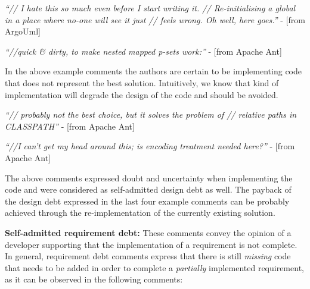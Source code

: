 {\vspace{1mm}
    \begin{displayquote}
        \textit{``// I hate this so much even before I start writing it. // Re-initialising a global in a place where no-one will see it just // feels wrong.  Oh well, here goes.''} - [from ArgoUml]
    \end{displayquote}
    \vspace{1mm}
    \begin{displayquote}
        \textit{``//quick \& dirty, to make nested mapped p-sets work:''} - [from Apache Ant]
    \end{displayquote}
\vspace{1mm}

In the above example comments the authors are certain to be implementing code that does not represent the best solution. Intuitively, we know that kind of implementation will degrade the design of the code and should be avoided. 

\vspace{1mm}
    \begin{displayquote}
        \textit{``// probably not the best choice, but it solves the problem of // relative paths in CLASSPATH''} - [from Apache Ant]
    \end{displayquote}
    \vspace{1mm}
    \begin{displayquote}   
        \textit{``//I can't get my head around this; is encoding treatment needed here?''} - [from Apache Ant]
    \end{displayquote}
\vspace{1mm}

The above comments expressed doubt and uncertainty when implementing the code and were considered as self-admitted design debt as well.
The payback of the design debt expressed in the last four example comments can be probably achieved through the re-implementation of the currently existing solution.

\vspace{1mm}
\noindent\textbf{Self-admitted requirement debt:} These comments convey the opinion of a developer supporting that the implementation of a requirement is not complete.  In general, requirement debt comments express
that there is still \emph{missing} code that needs to be added in order to complete a \emph{partially} implemented requirement, as it can be observed in the following comments:

}
